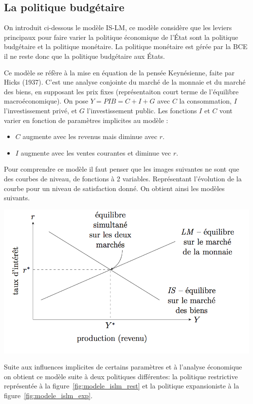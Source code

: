 \subsection{La politique budgétaire} %
\label{sub:la_politique_budgetaire}
On introduit ci-dessous le modèle IS-LM, ce modèle considère que les leviers principaux pour faire varier la politique économique de l'État sont la politique 
budgétaire et la politique monétaire. La politique monétaire est gérée par la BCE il ne reste donc que la politique budgétaire aux États.

\begin{tcolorbox}[title= Modèle IS-LM] 
	Ce modèle se réfère à la mise en équation de la pensée Keynésienne, faite par Hicks (1937). C'est une analyse conjointe du marché de la monnaie et du marché des biens, en supposant les prix fixes (représentaiton court terme de l'équilibre macroéconomique). 
  On pose $Y=PIB=C+I+G$ avec $C$ la consommation, $I$ l'investissement privé, et $G$ l'investissement public. Les fonctions $I$ et $C$ vont varier en fonction de paramètres implicites au modèle :
	\begin{itemize}[label=]
		\item $C$ augmente avec les revenus mais diminue avec $r$.
		\item $I$ augmente avec les ventes courantes et diminue vec $r$.
	\end{itemize}
Pour comprendre ce modèle il faut penser que les images suivantes ne sont que des courbes de niveau, de fonctions à 2 variables. Représentant l'évolution 
de la courbe pour un niveau de satisfaction donné. On obtient ainsi les modèles suivants. 

	\begin{center}
		\includegraphics[scale=0.5]{./img/im4}
	\end{center}
  \label{fig:modele_islm}

Suite aux influences implicites de certains paramètres et à l'analyse économique
on obtient ce modèle suite à deux politiques différentes:
la politique restrictive représentée à la figure~\ref{fig:modele_islm_rest}
et la politique expansioniste à la figure~\ref{fig:modele_islm_exp}.
\end{tcolorbox}

